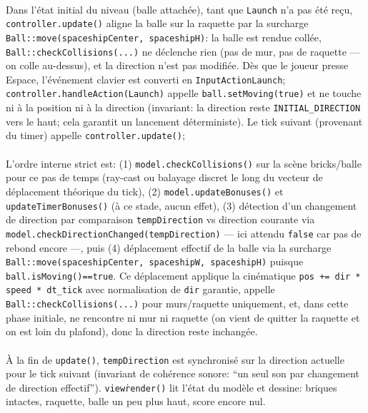 \documentclass[12pt]{article}
\begin{document}
\paragraph{}
Dans l’état initial du niveau (balle attachée), tant que \texttt{Launch} n’a pas été reçu, \colorbox{gray!20}{\texttt{controller.update()}} aligne la balle sur la raquette par la surcharge \colorbox{gray!20}{\texttt{Ball::move(spaceshipCenter, spaceshipH)}}: la balle est rendue collée, \texttt{Ball::checkCollisions(...)} ne déclenche rien (pas de mur, pas de raquette — on colle au-dessus), et la direction n’est pas modifiée. Dès que le joueur presse Espace, l’événement clavier est converti en \texttt{InputAction{Launch}}; \colorbox{gray!20}{\texttt{controller.handleAction(Launch)}} appelle \colorbox{gray!20}{\texttt{ball.setMoving(true)}} et ne touche ni à la position ni à la direction (invariant: la direction reste \texttt{INITIAL\_DIRECTION} vers le haut; cela garantit un lancement déterministe). Le tick suivant (provenant du timer) appelle \colorbox{gray!20}{\texttt{controller.update()}}; 

\paragraph{}

L’ordre interne strict est: (1) \colorbox{gray!20}{\texttt{model.checkCollisions()}} sur la scène bricks/balle pour ce pas de temps (ray-cast ou balayage discret le long du vecteur de déplacement théorique du tick), (2) \colorbox{gray!20}{\texttt{model.updateBonuses()}} et \colorbox{gray!20}{\texttt{updateTimerBonuses()}} (à ce stade, aucun effet), (3) détection d’un changement de direction par comparaison \texttt{tempDirection} vs direction courante via \colorbox{gray!20}{\texttt{model.checkDirectionChanged(tempDirection)}} — ici attendu \texttt{false} car pas de rebond encore —, puis (4) déplacement effectif de la balle via la surcharge \colorbox{gray!20}{\texttt{Ball::move(spaceshipCenter, spaceshipW, spaceshipH)}} puisque \texttt{ball.isMoving()==true}. Ce déplacement applique la cinématique \texttt{pos += dir * speed * dt\_tick} avec normalisation de \texttt{dir} garantie, appelle \colorbox{gray!20}{\texttt{Ball::checkCollisions(...)}} pour murs/raquette uniquement, et, dans cette phase initiale, ne rencontre ni mur ni raquette (on vient de quitter la raquette et on est loin du plafond), donc la direction reste inchangée. 

\paragraph{}
À la fin de \colorbox{gray!20}{\texttt{update()}}, \texttt{tempDirection} est synchronisé sur la direction actuelle pour le tick suivant (invariant de cohérence sonore: “un seul son par changement de direction effectif”). \colorbox{gray!20}{\texttt{view\.render()}} lit l’état du modèle et dessine: briques intactes, raquette, balle un peu plus haut, score encore nul.
\end{document}
